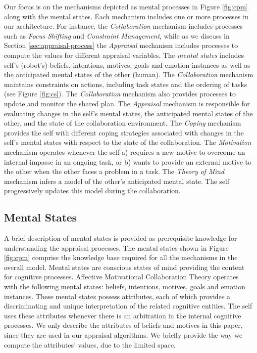 \documentclass{article}
\begin{document}
Our focus is on the mechanisms depicted as mental processes in Figure
\ref{fig:cpm} along with the mental states. Each mechanism includes one or
more processes in our architecture. For instance, the \textit{Collaboration}
mechanism includes processes such as \textit{Focus Shifting} and
\textit{Constraint Management}, while as we discuss in Section
\ref{sec:appraisal-process} the \textit{Appraisal} mechanism includes processes
to compute the values for different appraisal variables. The \textit{mental
states} includes self's (robot's) beliefs, intentions, motives, goals and
emotion instances as well as the anticipated mental states of the other (human).
The \textit{Collaboration} mechanism maintains constraints on actions, including
task states and the ordering of tasks (see Figure \ref{fig:cs}). The
\textit{Collaboration} mechanism also provides processes to update and monitor
the shared plan. The \textit{Appraisal} mechanism is responsible for evaluating
changes in the self's mental states, the anticipated mental states of the other,
and the state of the collaboration environment. The \textit{Coping} mechanism
provides the self with different coping strategies associated with changes in
the self's mental states with respect to the state of the collaboration. The
\textit{Motivation} mechanism operates whenever the self a) requires a new
motive to overcome an internal impasse in an ongoing task, or b) wants to
provide an external motive to the other when the other faces a problem in a
task. The \textit{Theory of Mind} mechanism infers a model of the other's
anticipated mental state. The self progressively updates this model during the
collaboration.

\subsection{Mental States}
\label{sec:mental-states}

A brief description of mental states is provided as prerequisite knowledge for
understanding the appraisal processes. The mental states shown in Figure
\ref{fig:cpm} comprise the knowledge base required for all the mechanisms in the
overall model. Mental states are conscious states of mind providing the content
for cognitive processes. Affective Motivational Collaboration Theory operates
with the following mental states: beliefs, intentions, motives, goals and
emotion instances. These mental states possess attributes, each of which
provides a discriminating and unique interpretation of the related cognitive
entities. The self uses these attributes whenever there is an arbitration in the
internal cognitive processes. We only describe the attributes of beliefs and
motives in this paper, since they are used in our appraisal algorithms. We
briefly provide the way we compute the attributes' values, due to the limited
space.
\end{document}
